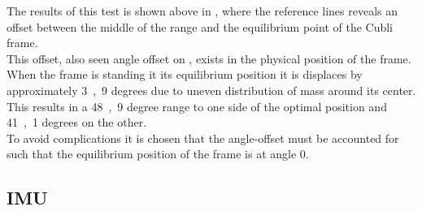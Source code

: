 \begin{minipage}{\linewidth}
\begin{minipage}{0.45\linewidth}
\begin{figure}[H]
  			\centering
  			\captionsetup{justification=centering}
  			\vspace{-.5cm}
  			\label{PotentiometerResolutionRadDeg}
  		\end{figure}\vspace{-5mm}
  	\end{minipage}
\end{minipage}

The results of this test is shown above in , where the reference lines reveals an offset between the middle of the range and the equilibrium point of the Cubli frame.\\
This offset, also seen angle offset on , exists in the physical position of the frame. When the frame is standing it its equilibrium position it is displaces by approximately \si{3,9} degrees due to uneven distribution of mass around its center.\\
This results in a \si{48,9} degree range to one side of the optimal position and \si{41,1} degrees on the other.\\
To avoid complications it is chosen that the angle-offset must be accounted for such that the equilibrium position of the frame is at angle 0.

\subsection{IMU}
